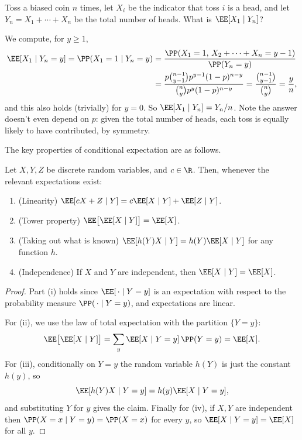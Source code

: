 \begin{example}
	Toss a biased coin $n$ times, let $X_i$ be the indicator that toss $i$ is a head, and let $Y_n = X_1 + \cdots + X_n$ be the total number of heads. What is $\EE[X_1 \mid Y_n]$?

	We compute, for $y \geq 1$,
	\begin{align*}
		\EE[X_1 \mid Y_n = y] = \PP(X_1 = 1 \mid Y_n = y) &= \frac{\PP(X_1 = 1, \, X_2 + \cdots + X_n = y - 1)}{\PP(Y_n = y)} \\
		&= \frac{p\binom{n - 1}{y - 1}p^{y-1}(1-p)^{n - y}}{\binom{n}{y}p^y(1-p)^{n-y}} = \frac{\binom{n-1}{y-1}}{\binom{n}{y}} = \frac{y}{n},
	\end{align*}
	and this also holds (trivially) for $y = 0$. So $\EE[X_1 \mid Y_n] = Y_n / n$. Note the answer doesn't even depend on $p$: given the total number of heads, each toss is equally likely to have contributed, by symmetry.
\end{example}

The key properties of conditional expectation are as follows.

\begin{proposition}
	Let $X, Y, Z$ be discrete random variables, and $c \in \R$. Then, whenever the relevant expectations exist:
	\begin{enumerate}[label=(\roman*)]
		\item (Linearity) $\EE[cX + Z \mid Y] = c\EE[X \mid Y] + \EE[Z \mid Y]$.
		\item (Tower property) $\EE\big[\EE[X \mid Y]\big] = \EE[X]$.
		\item (Taking out what is known) $\EE[h(Y) X \mid Y] = h(Y) \EE[X \mid Y]$ for any function $h$.
		\item (Independence) If $X$ and $Y$ are independent, then $\EE[X \mid Y] = \EE[X]$.
	\end{enumerate}
\end{proposition}
\begin{proof}
	Part (i) holds since $\EE[\,\cdot \mid Y = y]$ is an expectation with respect to the probability measure $\PP(\,\cdot \mid Y = y)$, and expectations are linear.

	For (ii), we use the law of total expectation with the partition $\{Y = y\}$:
	$$
	\EE\big[\EE[X \mid Y]\big] = \sum_y \EE[X \mid Y = y] \, \PP(Y = y) = \EE[X].
	$$
	For (iii), conditionally on $Y = y$ the random variable $h(Y)$ is just the constant $h(y)$, so
	$$
	\EE[h(Y)X \mid Y = y] = h(y)\EE[X \mid Y = y],
	$$
	and substituting $Y$ for $y$ gives the claim. Finally for (iv), if $X, Y$ are independent then $\PP(X = x \mid Y = y) = \PP(X = x)$ for every $y$, so $\EE[X \mid Y = y] = \EE[X]$ for all $y$.
\end{proof}

